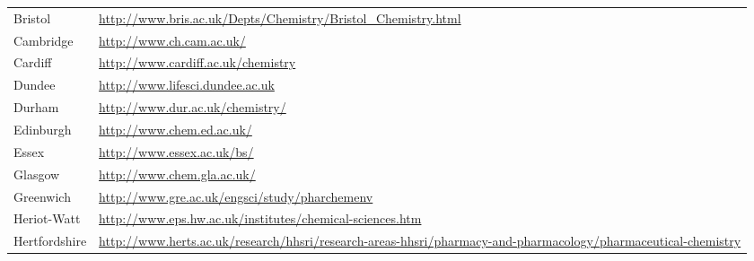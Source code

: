 \begin{table}[H]
\begin{tabular}{||p{2.5cm}|Y||}
 \footnotesize{Bristol                }            & \footnotesize{\url{http://www.bris.ac.uk/Depts/Chemistry/Bristol\_Chemistry.html}}                                                                         \\
 \footnotesize{Cambridge             }             & \footnotesize{\url{http://www.ch.cam.ac.uk/}}                                                                                                             \\
 \footnotesize{Cardiff              }              & \footnotesize{\url{http://www.cardiff.ac.uk/chemistry}}                                                                                                   \\
 \footnotesize{Dundee              }               & \footnotesize{\url{http://www.lifesci.dundee.ac.uk}}                                                                                                      \\
 \footnotesize{Durham             }                & \footnotesize{\url{http://www.dur.ac.uk/chemistry/}}                                                                                                      \\
 \footnotesize{Edinburgh         }                 & \footnotesize{\url{http://www.chem.ed.ac.uk/}}                                                                                                            \\
 \footnotesize{Essex            }                  & \footnotesize{\url{http://www.essex.ac.uk/bs/}                                                                                                          } \\
 \footnotesize{Glasgow         }                   & \footnotesize{\url{http://www.chem.gla.ac.uk/}}                                                                                                           \\
 \footnotesize{Greenwich      }                    & \footnotesize{\url{http://www.gre.ac.uk/engsci/study/pharchemenv}}                                                                                        \\
 \footnotesize{Heriot-Watt   }                     & \footnotesize{\url{http://www.eps.hw.ac.uk/institutes/chemical-sciences.htm}}                                                                             \\
 \footnotesize{Hertfordshire}                      & \footnotesize{\url{http://www.herts.ac.uk/research/hhsri/research-areas-hhsri/pharmacy-and-pharmacology/pharmaceutical-chemistry}}                        \\

\end{tabular}
\end{table}
